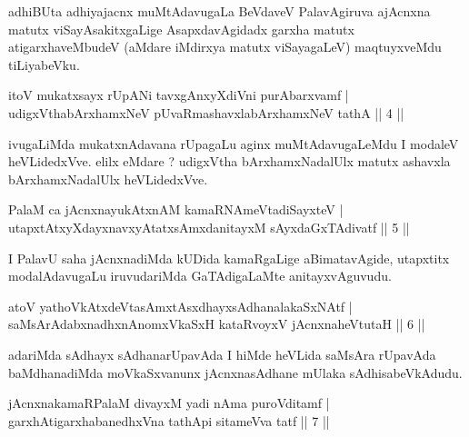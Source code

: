 \begin{artha}
adhiBUta adhiyajacnx muMtAdavugaLa BeVdaveV PalavAgiruva ajAcnxna matutx viSayAsakitxgaLige AsapxdavAgidadx garxha matutx atigarxhaveMbudeV (aMdare iMdirxya matutx viSayagaLeV) maqtuyxveMdu tiLiyabeVku.
\end{artha}

\begin{shl}
itoV mukatxsayx rUpANi tavxgAnxyXdiVni purA\s barxvamf |\\
udigxVthabArxhamxNeV pUvaRmashavxlabArxhamxNeV tathA \hfill || 4 ||
\end{shl}

\begin{artha}
ivugaLiMda mukatxnAdavana rUpagaLu aginx muMtAdavugaLeMdu I modaleV heVLidedxVve. elilx eMdare ? udigxVtha bArxhamxNadalUlx matutx ashavxla bArxhamxNadalUlx heVLidedxVve.
\end{artha}


\begin{shl}
PalaM ca jAcnxnayukAtxnAM kamaRNAmeVtadiSayxteV |\\
utapxtAtxyXdayxnavxyAtatxsAmxdanitayxM sAyxdaGxTAdivatf \hfill || 5 ||
\end{shl}

\begin{artha}
I PalavU saha jAcnxnadiMda kUDida kamaRgaLige aBimatavAgide, utapxtitx modalAdavugaLu iruvudariMda GaTAdigaLaMte anitayxvAguvudu.
\end{artha}

\begin{shl}
atoV yathoVkAtxdeVtasAmxtAsxdhayxsAdhanalakaSxNAtf |\\
saMsArAdabxnadhxnAnomxVkaSxH kataRvoyxV jAcnxnaheVtutaH \hfill || 6 ||
\end{shl}

\begin{artha}
adariMda sAdhayx sAdhanarUpavAda I hiMde heVLida saMsAra rUpavAda baMdhanadiMda moVkaSxvanunx jAcnxnasAdhane mUlaka sAdhisabeVkAdudu.
\end{artha}


\begin{shl}
jAcnxnakamaRPalaM divayxM yadi nAma puroVditamf |\\
garxhAtigarxhabanedhxVna tathA\s pi sitameVva tatf \hfill || 7 || 
\end{shl}

